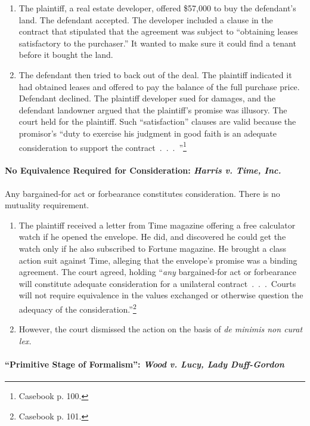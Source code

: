 \begin{enumerate}
    \item The plaintiff, a real estate developer, offered \$57,000 to buy the 
    defendant's land. The defendant accepted. The developer included a clause 
    in the contract that stipulated that the agreement was subject to 
    ``obtaining leases satisfactory to the purchaser.'' It wanted to make sure 
    it could find a tenant before it bought the land.
    \item The defendant then tried to back out of the deal. The plaintiff 
    indicated it had obtained leases and offered to pay the balance of the 
    full purchase price. Defendant declined. The plaintiff developer sued for 
    damages, and the defendant landowner argued that the plaintiff's promise 
    was illusory. The court held for the plaintiff. Such ``satisfaction'' 
    clauses are valid because the promisor's ``duty to exercise his judgment 
    in good faith is an adequate consideration to support the 
    contract~.~.~.~''\footnote{Casebook p. 100.}
\end{enumerate}

\paragraph{No Equivalence Required for Consideration: \emph{Harris v. Time, 
Inc.}}

Any bargained-for act or forbearance constitutes consideration. There is no 
mutuality requirement.

\begin{enumerate}
    \item The plaintiff received a letter from Time magazine offering a free 
    calculator watch if he opened the envelope. He did, and discovered he 
    could get the watch only if he also subscribed to Fortune magazine. He 
    brought a class action suit against Time, alleging that the envelope's 
    promise was a binding agreement. The court agreed, holding ``\emph{any} 
    bargained-for act or forbearance will constitute adequate consideration 
    for a unilateral contract~.~.~.~Courts will not require equivalence in the 
    values exchanged or otherwise question the adequacy of the 
    consideration.''\footnote{Casebook p. 101.}
    \item However, the court dismissed the action on the basis of \emph{de 
    minimis non curat lex.}
\end{enumerate}

\paragraph{``Primitive Stage of Formalism'': \emph{Wood v. Lucy, Lady 
Duff-Gordon}}

